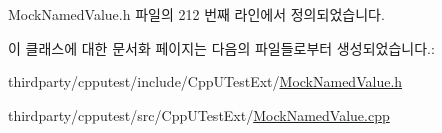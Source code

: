 Mock\+Named\+Value.\+h 파일의 212 번째 라인에서 정의되었습니다.



이 클래스에 대한 문서화 페이지는 다음의 파일들로부터 생성되었습니다.\+:\begin{DoxyCompactItemize}
\item 
thirdparty/cpputest/include/\+Cpp\+U\+Test\+Ext/\hyperlink{_mock_named_value_8h}{Mock\+Named\+Value.\+h}\item 
thirdparty/cpputest/src/\+Cpp\+U\+Test\+Ext/\hyperlink{_mock_named_value_8cpp}{Mock\+Named\+Value.\+cpp}\end{DoxyCompactItemize}
